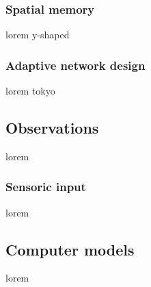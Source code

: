 \subsubsection{Spatial memory}

lorem y-shaped


\subsubsection{Adaptive network design}

lorem tokyo


\subsection{Observations}

lorem


\subsubsection{Sensoric input}

lorem


\subsection{Computer models}

lorem


